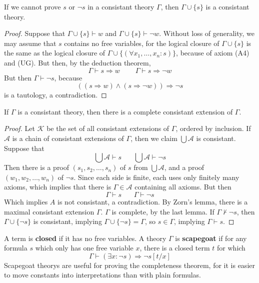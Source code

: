 \begin{theorem}
    If we cannot prove $s$ or $\neg s$ in a consistant theory $\Gamma$, then $\Gamma \cup \{ s \}$ is a consistant theory.
\end{theorem}
\begin{proof}
    Suppose that $\Gamma \cup \{ s \} \vdash w$ and $\Gamma \cup \{ s \} \vdash \neg w$. Without loss of generality, we may assume that $s$ contains no free variables, for the logical closure of $\Gamma \cup \{ s \}$ is the same as the logical closure of $\Gamma \cup \{ (\forall x_1, \dots, x_n: s) \}$, because of axiom (A4) and (UG). But then, by the deduction theorem,
    \[ \Gamma \vdash s \Rightarrow w\ \ \ \ \ \ \ \ \ \ \Gamma \vdash s \Rightarrow \neg w \]
    But then $\Gamma \vdash \neg s$, because
    \[ ((s \Rightarrow w) \wedge (s \Rightarrow \neg w)) \Rightarrow \neg s \]
    is a tautology, a contradiction.
\end{proof}

\begin{lemma}[Lindenbaum]
    If $\Gamma$ is a consistant theory, then there is a complete consistant extension of $\Gamma$.
\end{lemma}
\begin{proof}
    Let $\mathcal{K}$ be the set of all consistant extensions of $\Gamma$, ordered by inclusion. If $\mathcal{A}$ is a chain of consistant extensions of $\Gamma$, then we claim $\bigcup \mathcal{A}$ is consistant. Suppose that
    \[ \bigcup \mathcal{A} \vdash s\ \ \ \ \ \ \ \ \bigcup \mathcal{A} \vdash \neg s \]
    Then there is a proof $(s_1, s_2, \dots, s_n)$ of $s$ from $\bigcup \mathcal{A}$, and a proof $(w_1, w_2, \dots, w_n)$ of $\neg s$. Since each side is finite, each uses only finitely many axioms, which implies that there is $\Gamma \in \mathcal{A}$ containing all axioms. But then
    \[ \Gamma \vdash s\ \ \ \ \ \ \ \ \Gamma \vdash \neg s \]
    Which implies $A$ is not consistant, a contradiction. By Zorn's lemma, there is a maximal consistant extension $\Gamma$. $\Gamma$ is complete, by the last lemma. If $\Gamma \not \vdash \neg s$, then $\Gamma \cup \{ \neg s \}$ is consistant, implying $\Gamma \cup \{ \neg s \} = \Gamma$, so $s \in \Gamma$, implying $\Gamma \vdash s$.
\end{proof}

A term is {\bf closed} if it has no free variables. A theory $\Gamma$ is {\bf scapegoat} if for any formula $s$ which only has one free variable $x$, there is a closed term $t$ for which
%
\[ \Gamma \vdash (\exists x: \neg s) \Rightarrow \neg s[t/x] \]
%
Scapegoat theorys are useful for proving the completeness theorem, for it is easier to move constants into interpretations than with plain formulas.

